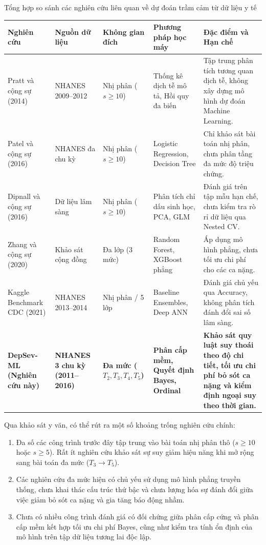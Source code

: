 \begin{table}{Tổng hợp so sánh các nghiên cứu liên quan về dự đoán trầm cảm từ dữ liệu y tế}
\centering
\footnotesize
\setlength{\tabcolsep}{3pt}
\label{tab:related-works}
\begin{tabularx}{\textwidth}{p{3.2cm} p{2.2cm} p{2.4cm} p{2.8cm} X}
\toprule
\textbf{Nghiên cứu} & \textbf{Nguồn dữ liệu} & \textbf{Không gian đích} & \textbf{Phương pháp học máy} & \textbf{Đặc điểm và Hạn chế} \\
\midrule
Pratt và cộng sự (2014) \cite{pratt2014depression} & NHANES 2009--2012 & Nhị phân ($s \ge 10$) & Thống kê dịch tễ mô tả, Hồi quy đa biến & Tập trung phân tích tương quan dịch tễ, không xây dựng mô hình dự đoán Machine Learning. \\
\midrule
Patel và cộng sự (2016) \cite{patel2016systematic} & NHANES đa chu kỳ & Nhị phân ($s \ge 10$) & Logistic Regression, Decision Tree & Chỉ khảo sát bài toán nhị phân, chưa phân tầng đa mức độ triệu chứng. \\
\midrule
Dipnall và cộng sự (2016) \cite{dipnall2016fusing} & Dữ liệu lâm sàng & Nhị phân ($s \ge 10$) & Phân tích chỉ dấu sinh học, PCA, GLM & Đánh giá trên tập mẫu hạn chế, chưa kiểm tra rò rỉ dữ liệu qua Nested CV. \\
\midrule
Zhang và cộng sự (2020) \cite{zhang2020machine} & Khảo sát cộng đồng & Đa lớp (3 mức) & Random Forest, XGBoost phẳng & Áp dụng mô hình phẳng, chưa tối ưu chi phí cho các ca nặng. \\
\midrule
Kaggle Benchmark CDC (2021) & NHANES 2013--2014 & Nhị phân / 5 lớp & Baseline Ensembles, Deep ANN & Đánh giá chủ yếu qua Accuracy, không phân tích đánh đổi sai số lâm sàng. \\
\midrule
\textbf{DepSev-ML (Nghiên cứu này)} & \textbf{NHANES 3 chu kỳ (2011--2016)} & \textbf{Đa mức ($T_2, T_3, T_4, T_5$)} & \textbf{Phân cấp mềm, Quyết định Bayes, Ordinal} & \textbf{Khảo sát quy luật suy thoái theo độ chi tiết, tối ưu chi phí bỏ sót ca nặng và kiểm định ngoại suy theo thời gian.} \\
\bottomrule
\end{tabularx}
\end{table}

Qua khảo sát y văn, có thể rút ra một số khoảng trống nghiên cứu chính:
\begin{enumerate}
    \item Đa số các công trình trước đây tập trung vào bài toán nhị phân thô ($s \ge 10$ hoặc $s \ge 5$). Rất ít nghiên cứu khảo sát sự suy giảm hiệu năng khi mở rộng sang bài toán đa mức ($T_3 \to T_5$).
    \item Các nghiên cứu đa mức hiện có chủ yếu sử dụng mô hình phẳng truyền thống, chưa khai thác cấu trúc thứ bậc và chưa lượng hóa sự đánh đổi giữa việc giảm bỏ sót ca nặng và gia tăng báo động nhầm.
    \item Chưa có nhiều công trình đánh giá có đối chứng giữa phân cấp cứng và phân cấp mềm kết hợp tối ưu chi phí Bayes, cũng như kiểm tra tính ổn định của mô hình trên tập dữ liệu tương lai độc lập.
\end{enumerate}

